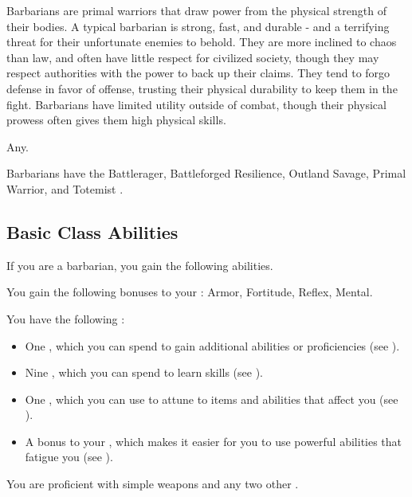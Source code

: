     Barbarians are primal warriors that draw power from the physical strength of their bodies.
    A typical barbarian is strong, fast, and durable - and a terrifying threat for their unfortunate enemies to behold.
    They are more inclined to chaos than law, and often have little respect for civilized society, though they may respect authorities with the power to back up their claims.
    They tend to forgo defense in favor of offense, trusting their physical durability to keep them in the fight.
    Barbarians have limited utility outside of combat, though their physical prowess often gives them high physical skills.

     Any.

     Barbarians have the Battlerager, Battleforged Resilience, Outland Savage, Primal Warrior, and Totemist .

    \subsection{Basic Class Abilities}
        If you are a barbarian, you gain the following abilities.

        You gain the following bonuses to your :  Armor,  Fortitude,  Reflex,  Mental.

         You have the following :
        \begin{itemize}
            \item One , which you can spend to gain additional abilities or proficiencies (see ).
            \item Nine , which you can spend to learn skills (see ).
            \item One , which you can use to attune to items and abilities that affect you (see ).
            \item A  bonus to your , which makes it easier for you to use powerful abilities that fatigue you (see ).
        \end{itemize}

        You are proficient with simple weapons and any two other .

